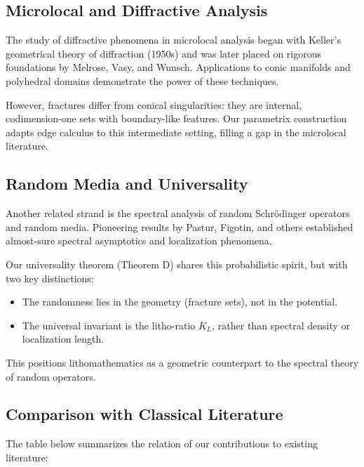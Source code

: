 \subsection{Microlocal and Diffractive Analysis}

The study of diffractive phenomena in microlocal analysis began with Keller's
geometrical theory of diffraction (1950s) and was later placed on rigorous
foundations by Melrose, Vasy, and Wunsch. Applications to conic manifolds and
polyhedral domains demonstrate the power of these techniques.

However, fractures differ from conical singularities: they are internal,
codimension-one sets with boundary-like features. Our parametrix construction
adapts edge calculus to this intermediate setting, filling a gap in the
microlocal literature.

\subsection{Random Media and Universality}

Another related strand is the spectral analysis of random Schrödinger operators
and random media. Pioneering results by Pastur, Figotin, and others established
almost-sure spectral asymptotics and localization phenomena.

Our universality theorem (Theorem D) shares this probabilistic spirit, but with
two key distinctions:
\begin{itemize}
  \item The randomness lies in the geometry (fracture sets), not in the
  potential.
  \item The universal invariant is the litho-ratio $K_L$, rather than spectral
  density or localization length.
\end{itemize}

This positions lithomathematics as a geometric counterpart to the spectral
theory of random operators.

\subsection{Comparison with Classical Literature}

The table below summarizes the relation of our contributions to existing
literature:

